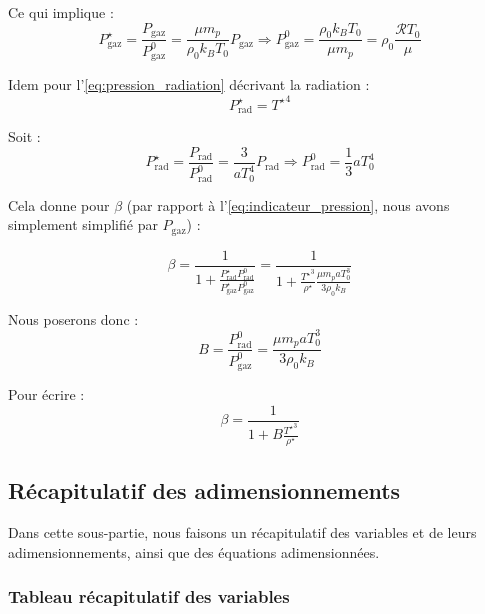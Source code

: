 Ce qui implique :
\begin{equation}
    P_\mathrm{gaz}^\star = \frac{P_\mathrm{gaz}}{P_\mathrm{gaz}^0} = \frac{\mu m_p}{\rho_0 k_B T_0} P_\mathrm{gaz} \Rightarrow P_\mathrm{gaz}^0 = \frac{\rho_0 k_B T_0}{\mu m_p} = \rho_0 \frac{\mathcal{R} T_0}{\mu}
\end{equation}

Idem pour l’\cref{eq:pression_radiation} décrivant la radiation :
\begin{equation}
    P_\mathrm{rad}^\star = {T^\star}^4
\end{equation}

Soit :
\begin{equation}
    P_\mathrm{rad}^\star = \frac{P_\mathrm{rad}}{P_\mathrm{rad}^0} = \frac{3}{a T_0^4} P_\mathrm{rad} \Rightarrow P_\mathrm{rad}^0 = \frac{1}{3} a T_0^4
\end{equation}

Cela donne pour $\beta$ (par rapport à l’\cref{eq:indicateur_pression}, nous
avons simplement simplifié par $P_\mathrm{gaz}$) :

\begin{equation}
    \beta = \frac{1}{1 + \frac{P_\mathrm{rad}^\star P_\mathrm{rad}^0}{P_\mathrm{gaz}^\star P_\mathrm{gaz}^0}} = \frac{1}{1 + \frac{{T^\star}^3}{\rho^\star} \frac{\mu m_p a T_0^3}{3 \rho_0 k_B}}
\end{equation}

Nous poserons donc :
\begin{equation}
    B = \frac{P_\mathrm{rad}^0}{P_\mathrm{gaz}^0} = \frac{\mu m_p a T_0^3}{3 \rho_0 k_B}
\end{equation}

Pour écrire :
\begin{equation}
    \beta = \frac{1}{1 + B \frac{{T^\star}^3}{\rho^\star}}
\end{equation}

\subsection{Récapitulatif des adimensionnements}

Dans cette sous-partie, nous faisons un récapitulatif des variables et de leurs
adimensionnements, ainsi que des équations adimensionnées.

\subsubsection{Tableau récapitulatif des variables}


